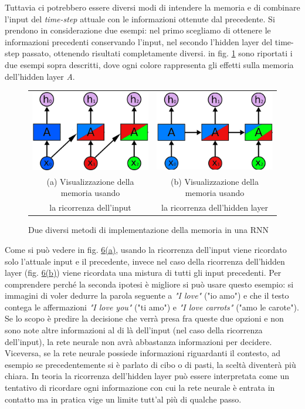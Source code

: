 Tuttavia ci potrebbero essere diversi modi di intendere la memoria e di combinare l'input del \textit{time-step} attuale con le informazioni ottenute dal precedente. Si prendono in considerazione due esempi: nel primo scegliamo di ottenere le informazioni precedenti conservando l'input, nel secondo l'hidden layer del time-step passato, ottenendo risultati completamente diversi. in fig. \ref{fig:1.6} sono riportati i due esempi sopra descritti, dove ogni colore rappresenta gli effetti sulla memoria dell'hidden layer \textit{A}.
\begin{figure}[ht]
	\centering
	\begin{tabular}{cc}
		\includegraphics[width=0.4\linewidth]{img/input_memory.png} &
		\includegraphics[width=0.4\linewidth]{img/hidden_memory.png} \\
		\footnotesize (a) Visualizzazione della memoria usando & \footnotesize (b) Visualizzazione della memoria usando \\ \footnotesize la ricorrenza dell'input & \footnotesize la ricorrenza dell'hidden layer
	\end{tabular}
	\caption{Due diversi metodi di implementazione della memoria in una RNN}
	\label{fig:1.6}
\end{figure}

Come si può vedere in fig. \hyperref[fig:1.6]{6(a)}, usando la ricorrenza dell'input viene ricordato solo l'attuale input e il precedente, invece nel caso della ricorrenza dell'hidden layer (fig. \hyperref[fig:1.6]{6(b)}) viene ricordata una mistura di tutti gli input precedenti. Per comprendere perché la seconda ipotesi è migliore si può usare questo esempio: si immagini di voler dedurre la parola seguente a \textit{"I love"} ("io amo") e che il testo contega le affermazioni \textit{"I love you"} ("ti amo") e \textit{"I love carrots"} ("amo le carote"). Se lo scopo è predire la decisione che verrà presa fra queste due opzioni e non sono note altre informazioni al di là dell'input (nel caso della ricorrenza dell'input), la rete neurale non avrà abbastanza informazioni per decidere. Viceversa, se la rete neurale possiede informazioni riguardanti il contesto, ad esempio se precedentemente si è parlato di cibo o di pasti, la sceltà diventerà più chiara. In teoria la ricorrenza dell'hidden layer può essere interpretata come un tentativo di ricordare ogni informazione con cui la rete neurale è entrata in contatto ma in pratica vige un limite tutt'al più di qualche passo.

